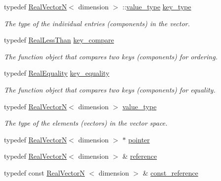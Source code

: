 \begin{DoxyCompactItemize}
\item 
typedef \hyperlink{classmetrobotics_1_1RealVectorN}{\-Real\-Vector\-N}$<$ dimension $>$\*
\-::\hyperlink{classmetrobotics_1_1Lerp_ab1be5a6a96856f10c5eadc416d630a40}{value\-\_\-type} \hyperlink{classmetrobotics_1_1Lerp_a3cd6f9215623083b5ed90f4c03ac6dc7}{key\-\_\-type}
\begin{DoxyCompactList}\small\item\em \-The type of the individual entries (components) in the vector. \end{DoxyCompactList}\item 
typedef \hyperlink{classmetrobotics_1_1RealLessThan}{\-Real\-Less\-Than} \hyperlink{classmetrobotics_1_1Lerp_af2461f16ba03ed44a4896aba2cea4d29}{key\-\_\-compare}
\begin{DoxyCompactList}\small\item\em \-The function object that compares two keys (components) for ordering. \end{DoxyCompactList}\item 
typedef \hyperlink{classmetrobotics_1_1RealEquality}{\-Real\-Equality} \hyperlink{classmetrobotics_1_1Lerp_ae164917b993d09546ee1dff125cc7847}{key\-\_\-equality}
\begin{DoxyCompactList}\small\item\em \-The function object that compares two keys (components) for equality. \end{DoxyCompactList}\item 
typedef \hyperlink{classmetrobotics_1_1RealVectorN}{\-Real\-Vector\-N}$<$ dimension $>$ \hyperlink{classmetrobotics_1_1Lerp_ab1be5a6a96856f10c5eadc416d630a40}{value\-\_\-type}
\begin{DoxyCompactList}\small\item\em \-The type of the elements (vectors) in the vector space. \end{DoxyCompactList}\item 
typedef \hyperlink{classmetrobotics_1_1RealVectorN}{\-Real\-Vector\-N}$<$ dimension $>$ $\ast$ \hyperlink{classmetrobotics_1_1Lerp_a77fb99f54e951d0e63c43e3249719e97}{pointer}
\item 
typedef \hyperlink{classmetrobotics_1_1RealVectorN}{\-Real\-Vector\-N}$<$ dimension $>$ \& \hyperlink{classmetrobotics_1_1Lerp_ae64c70e9dc4c0c99af76b155f6786ec0}{reference}
\item 
typedef const \hyperlink{classmetrobotics_1_1RealVectorN}{\-Real\-Vector\-N}\*
$<$ dimension $>$ \& \hyperlink{classmetrobotics_1_1Lerp_a815b15d3fb2de9989d053e9d17fac48f}{const\-\_\-reference}

\end{DoxyCompactItemize}
